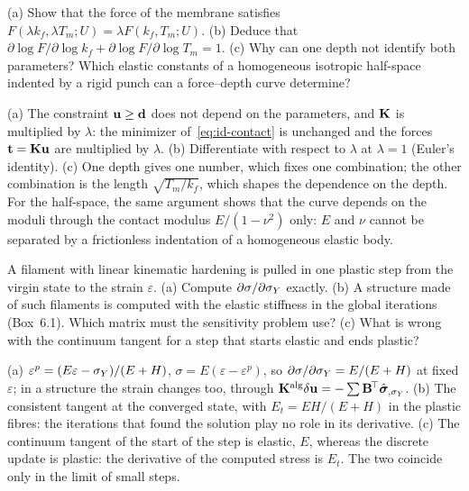 \label{exo:id-q-homog}
%
(a) Show that the force of the membrane satisfies $F(\lambda k_f,\lambda T_m;U)=\lambda F(k_f,T_m;U)$.
(b) Deduce that $\partial\log F/\partial\log k_f+\partial\log F/\partial\log T_m=1$.
(c) Why can one depth not identify both parameters? Which elastic constants of a
homogeneous isotropic half-space indented by a rigid punch can a force--depth
curve determine?
\begin{solution}
(a) The constraint $\mathbf{u}\ge\mathbf{d}$ does not depend on the parameters, and
$\mathbf{K}$ is multiplied by $\lambda$: the minimizer of~\eqref{eq:id-contact} is unchanged
and the forces $\mathbf{t}=\mathbf{K}\mathbf{u}$ are multiplied by $\lambda$. (b) Differentiate
with respect to $\lambda$ at $\lambda=1$ (Euler's identity). (c) One depth gives one
number, which fixes one combination; the other combination is the length
$\sqrt{T_m/k_f}$, which shapes the dependence on the depth. For the half-space, the
same argument shows that the curve depends on the moduli through the contact
modulus $E/(1-\nu^2)$ only: $E$ and $\nu$ cannot be separated by a frictionless
indentation of a homogeneous elastic body.
\end{solution}

\label{exo:id-q-tangent}
%
A filament with linear kinematic hardening is pulled in one plastic step from the
virgin state to the strain $\varepsilon$. (a) Compute $\partial\sigma/\partial\sigma_{Y}$ exactly. (b)
A structure made of such filaments is computed with the elastic stiffness in the
global iterations (Box~6.1). Which matrix must the sensitivity problem use? (c)
What is wrong with the continuum tangent for a step that starts elastic and ends
plastic?
\begin{solution}
(a) $\varepsilon^p=(E\varepsilon-\sigma_{Y})/(E+H)$, $\sigma=E(\varepsilon-\varepsilon^p)$, so
$\partial\sigma/\partial\sigma_{Y}=E/(E+H)$ at fixed $\varepsilon$; in a structure the
strain changes too, through $\mathbf{K}^{\mathrm{alg}}\delta\mathbf{u}=-\sum\mathbf{B}^{\!\top}\hat{\bm{\sigma}}_{,\sigma_{Y}}$.
(b) The consistent tangent at the converged state, with $E_t=EH/(E+H)$ in the
plastic fibres: the iterations that found the solution play no role in its
derivative. (c) The continuum tangent of the start of the step is elastic, $E$,
whereas the discrete update is plastic: the derivative of the computed stress is
$E_t$. The two coincide only in the limit of small steps.
\end{solution}

